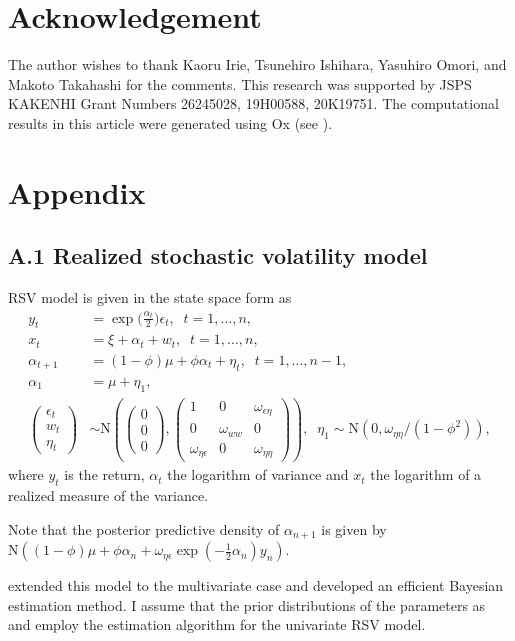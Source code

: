 \documentclass[11pt]{article}
\begin{document}
\section*{Acknowledgement}
The author wishes to thank Kaoru Irie, Tsunehiro Ishihara, Yasuhiro Omori, and Makoto Takahashi for the comments. 
This research was supported by JSPS KAKENHI Grant Numbers 26245028, 19H00588, 20K19751. 
The computational results in this article were generated using Ox (see \cite{Doornik(2009)}). 

\section*{Appendix}
\subsection*{A.1 Realized stochastic volatility model}
RSV model is given in the state space form as
\begin{align}
y_t &= \exp\Big( \frac{\alpha_t}{2}  \Big) \epsilon_t, \;\; t=1, \ldots, n, \\
x_t &= \xi +\alpha_t + w_t,  \;\; t=1, \ldots, n, \\
\alpha_{t+1} &= (1-\phi)\mu +\phi\alpha_t +\eta_t,  \;\; t=1, \ldots, n-1, \\
\alpha_{1} &= \mu +\eta_1, \\
\begin{pmatrix} \epsilon_t \\ w_t \\ \eta_t \end{pmatrix} 
&\sim \mathrm{N} \left( 
\begin{pmatrix} 0 \\ 0 \\ 0 \end{pmatrix},  
\begin{pmatrix} 1 & 0 & \omega_{\epsilon\eta} \\
0 & \omega_{ww} & 0 \\
\omega_{\eta\epsilon} & 0 & \omega_{\eta\eta} \end{pmatrix} 
\right), \;\;
\eta_1 \sim\mathrm{N}(0, \omega_{\eta\eta}/(1-\phi^2)), 
\end{align}
where $y_t$ is the return, $\alpha_t$ the logarithm of variance and $x_t$ the logarithm of a realized measure of the variance. 

Note that the posterior predictive density of $\alpha_{n+1}$ is given by $\mathrm{N}((1-\phi)\mu+\phi\alpha_n +\omega_{\eta\epsilon} \exp(-\frac{1}{2}\alpha_n)y_n)$.  

\cite{KuroseOmori(2020)} extended this model to the multivariate case and developed an efficient Bayesian estimation method. 
I assume that the prior distributions of the parameters as \cite{KuroseOmori(2020)} and employ the estimation algorithm for the univariate RSV model. 



\end{document}
